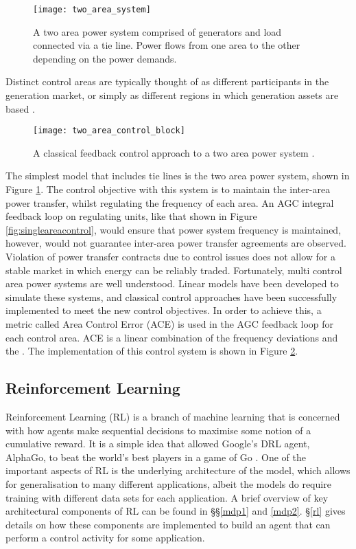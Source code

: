 \begin{figure}[ht]
	\centering
	\texttt{[image: two\_area\_system]}
	\caption{A two area power system comprised of generators and load connected via a tie line. Power flows from one area to the other depending on the power demands.}
	\label{fig:twoareapower}
\end{figure}

Distinct control areas are typically thought of as different participants in the generation market, or simply as different regions in which generation assets are based \cite{Kothari2011}.

\begin{figure}[ht]
	\centering
	\texttt{[image: two\_area\_control\_block]}
	\caption{A classical feedback control approach to a two area power system \cite{Kundur1994}.}
	\label{fig:twoareacontrolblock}
\end{figure}

The simplest model that includes tie lines is the two area power system, shown in Figure \ref{fig:twoareapower}. The control objective with this system is to maintain the inter-area power transfer, whilst regulating the frequency of each area. An AGC integral feedback loop on regulating units, like that shown in Figure \ref{fig:singleareacontrol}, would ensure that power system frequency is maintained, however, would not guarantee inter-area power transfer agreements are observed. Violation of power transfer contracts due to control issues does not allow for a stable market in which energy can be reliably traded. Fortunately, multi control area power systems are well understood. Linear models have been developed to simulate these systems, and classical control approaches have been successfully implemented to meet the new control objectives. In order to achieve this, a metric called Area Control Error (ACE) is used in the AGC feedback loop for each control area. ACE is a linear combination of the frequency deviations and the . The implementation of this control system is shown in Figure \ref{fig:twoareacontrolblock}.


\subsection{Reinforcement Learning}
Reinforcement Learning (RL) is a branch of machine learning that is concerned with how agents make sequential decisions to maximise some notion of a cumulative reward. It is a simple idea that allowed Google's DRL agent, AlphaGo, to beat the world's best players in a game of Go \cite{Silver2016}. One of the important aspects of RL is the underlying architecture of the model, which allows for generalisation to many different applications, albeit the models do require training with different data sets for each application. A brief overview of key architectural components of RL can be found in \S{}\S{}\ref{mdp1} and \ref{mdp2}. \S{}\ref{rl} gives details on how these components are implemented to build an agent that can perform a control activity for some application.

